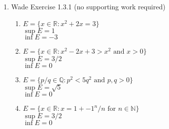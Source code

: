 \documentclass[a4paper]{article}
\newcommand{\real}{\mathbb{R}}
\begin{document}
\begin{flushleft}
\begin{enumerate}
\begin{proof}
\begin{enumerate}
                    \item
                    Recall $\forall$ upper bound $M$ of $A$, $\sup A \leq M$. \\
                    Also notice that by definition of supremum, $a\leq \sup A \leq M$. \\
                    $a\leq \sup A \leq M \implies \varepsilon a\leq \varepsilon \sup A \leq \varepsilon M \implies \varepsilon a\leq \varepsilon M$ \\
                    $\implies y \leq \varepsilon M$. \\
                    So, $\varepsilon M$ is an upper bound of $B$, and $\varepsilon M \subseteq N$.\\
                    $\therefore \sup A \leq M$, thus $\varepsilon \sup A \leq N$. \\
                \end{enumerate}
                Since both a and b were shown, If $A\neq \varnothing$ and is a bounded subset of $\real$ and $B=\{ \varepsilon x : x \in A\}$, then $\sup B =  \varepsilon \sup A$
                
            \end{proof}
            

            \item
            Wade Exercise 1.3.1 (no supporting work required)
            \begin{enumerate}
                \item
                $ E = \{x\in \real : x^2 +2x = 3\}$ \\
                $\sup E = 1$ \\ 
                $\inf E = -3$

                \item
                $ E = \{x\in \real : x^2 -2x + 3 > x^2 \text{ and } x>0\}$\\
                $\sup E = 3/2$ \\
                $\inf E = 0$


                \item
                $ E = \{p/q \in \mathbb{Q} : p^2 < 5q^2 \text{ and } p,q>0 \}$\\
                $\sup E = \sqrt{5}$ \\
                $\inf E = 0$

                \item
                $ E = \{x \in \real : x = 1+ {-1}^n / n \text{ for }n\in \mathbb{N} \}$\\
                $\sup E = 3/2$ \\
                $\inf E = 0$


\end{enumerate}
\end{enumerate}
\end{flushleft}
\end{document}
